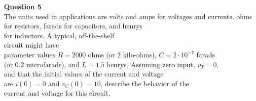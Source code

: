 \documentclass[preview]{standalone}
\begin{document}
\begin{center}
\raggedright
                    \textbf{Question 5}\\
                    The units used in applications are volts and amps for voltages 
                    and currents, ohms for resistors, farads for capacitors, and henrys \\
                    for inductors. A typical, off-the-shelf \\ circuit might have \\
                    parameter values $R = 2000$ ohms (or 2 kilo-ohms), $C = 2 · 10^{-7}$  farads \\
                     (or 0.2 microfarads), and $L = 1.5$ henrys. Assuming zero input, $v_T = 0$, \\
                    and that the initial values of the current and voltage \\
                    are $i(0) = 0$ and $v_C(0) = 10$, describe the behavior of the \\
                    current and voltage for this circuit.
\end{center}
\end{document}
